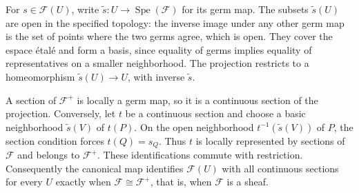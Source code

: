 For $s\in\mathscr F(U)$, write $\widetilde s:U\to\operatorname{Spe}(\mathscr F)$ for its germ map. The subsets $\widetilde s(U)$ are open in the specified topology: the inverse image under any other germ map is the set of points where the two germs agree, which is open. They cover the espace étalé and form a basis, since equality of germs implies equality of representatives on a smaller neighborhood. The projection restricts to a homeomorphism $\widetilde s(U)\to U$, with inverse $\widetilde s$.

A section of $\mathscr F^+$ is locally a germ map, so it is a continuous section of the projection. Conversely, let $t$ be a continuous section and choose a basic neighborhood $\widetilde s(V)$ of $t(P)$. On the open neighborhood $t^{-1}(\widetilde s(V))$ of $P$, the section condition forces $t(Q)=s_Q$. Thus $t$ is locally represented by sections of $\mathscr F$ and belongs to $\mathscr F^+$. These identifications commute with restriction. Consequently the canonical map identifies $\mathscr F(U)$ with all continuous sections for every $U$ exactly when $\mathscr F\cong\mathscr F^+$, that is, when $\mathscr F$ is a sheaf.
